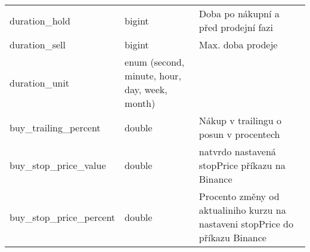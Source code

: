 \begin{center}
\begin{longtable}[t]{|l|C{4cm}|p{4cm}|}
        duration\_hold                       & bigint                                                                                                                                                                                                               & Doba po nákupní a před prodejní fazi                                                                                              \\
        duration\_sell                       & bigint                                                                                                                                                                                                               & Max. doba prodeje                                                                                                                 \\
        duration\_unit                       & enum (second, minute, hour, day, week, month)                                                                                                                                                                        &                                                                                                                                   \\
        buy\_trailing\_percent               & double                                                                                                                                                                                                               & Nákup v trailingu o posun v procentech                                                                                            \\
        buy\_stop\_price\_value              & double                                                                                                                                                                                                               & natvrdo nastavená stopPrice příkazu na Binance                                                                                    \\
        buy\_stop\_price\_percent            & double                                                                                                                                                                                                               & Procento změny od aktualiniho kurzu na nastaveni stopPrice do příkazu Binance                                                     \\

\end{longtable}
\end{center}
